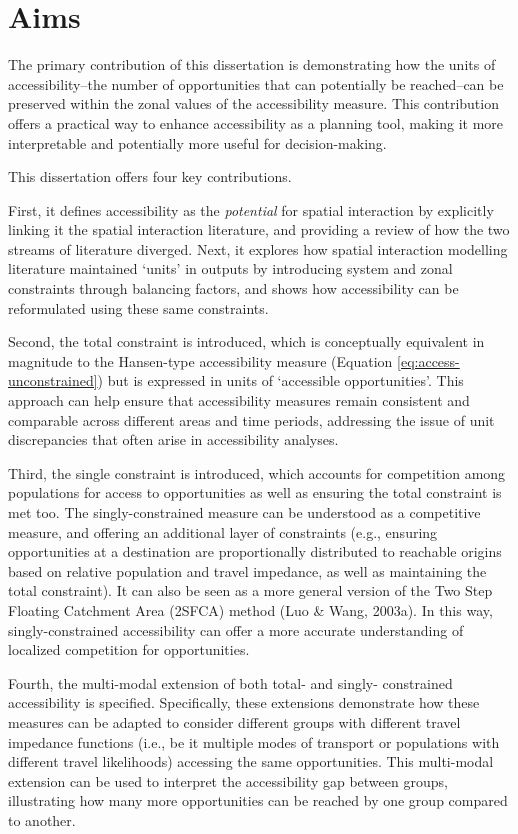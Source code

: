 \documentclass[
11pt, %
oneside, %
english, %
singlespacing, %
]{macthesis} %
\begin{document}
\section{Aims}\label{aims}

The primary contribution of this dissertation is demonstrating how the units of accessibility--the number of opportunities that can potentially be reached--can be preserved within the zonal values of the accessibility measure. This contribution offers a practical way to enhance accessibility as a planning tool, making it more interpretable and potentially more useful for decision-making.

This dissertation offers four key contributions.

First, it defines accessibility as the \emph{potential} for spatial interaction by explicitly linking it the spatial interaction literature, and providing a review of how the two streams of literature diverged. Next, it explores how spatial interaction modelling literature maintained `units' in outputs by introducing system and zonal constraints through balancing factors, and shows how accessibility can be reformulated using these same constraints.

Second, the total constraint is introduced, which is conceptually equivalent in magnitude to the Hansen-type accessibility measure (Equation \ref{eq:access-unconstrained}) but is expressed in units of `accessible opportunities'. This approach can help ensure that accessibility measures remain consistent and comparable across different areas and time periods, addressing the issue of unit discrepancies that often arise in accessibility analyses.

Third, the single constraint is introduced, which accounts for competition among populations for access to opportunities as well as ensuring the total constraint is met too. The singly-constrained measure can be understood as a competitive measure, and offering an additional layer of constraints (e.g., ensuring opportunities at a destination are proportionally distributed to reachable origins based on relative population and travel impedance, as well as maintaining the total constraint). It can also be seen as a more general version of the Two Step Floating Catchment Area (2SFCA) method (Luo \& Wang, 2003a). In this way, singly-constrained accessibility can offer a more accurate understanding of localized competition for opportunities.

Fourth, the multi-modal extension of both total- and singly- constrained accessibility is specified. Specifically, these extensions demonstrate how these measures can be adapted to consider different groups with different travel impedance functions (i.e., be it multiple modes of transport or populations with different travel likelihoods) accessing the same opportunities. This multi-modal extension can be used to interpret the accessibility gap between groups, illustrating how many more opportunities can be reached by one group compared to another.
\end{document}

